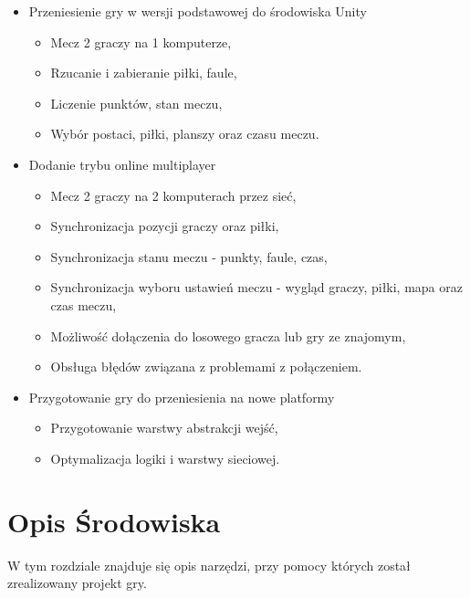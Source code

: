 \documentclass[a4paper,12pt,twoside,openany]{report}
\begin{document}
\begin{itemize}
    \item Przeniesienie gry w wersji podstawowej do środowiska Unity
    \begin{itemize}
        \item Mecz 2 graczy na 1 komputerze,
        \item Rzucanie i zabieranie piłki, faule,
        \item Liczenie punktów, stan meczu,
        \item Wybór postaci, piłki, planszy oraz czasu meczu.
    \end{itemize}
    
    \item Dodanie trybu online multiplayer
    \begin{itemize}
        \item Mecz 2 graczy na 2 komputerach przez sieć,
        \item Synchronizacja pozycji graczy oraz piłki,
        \item Synchronizacja stanu meczu - punkty, faule, czas,
        \item Synchronizacja wyboru ustawień meczu - wygląd graczy, piłki, mapa oraz czas meczu,
        \item Możliwość dołączenia do losowego gracza lub gry ze znajomym,
        \item Obsługa błędów związana z problemami z połączeniem.
    \end{itemize}
    
    \item Przygotowanie gry do przeniesienia na nowe platformy
    \begin{itemize}
        \item Przygotowanie warstwy abstrakcji wejść,
        \item Optymalizacja logiki i warstwy sieciowej.
    \end{itemize}
\end{itemize}



\chapter{Opis Środowiska}
W tym rozdziale znajduje się opis narzędzi, przy pomocy których został zrealizowany projekt gry.
\end{document}
